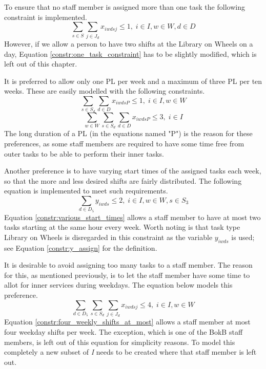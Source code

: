 To ensure that no staff member is assigned more than one task the following constraint is implemented.
\begin{equation} \label{constr:one_task_constraint}
\sum_{s\in S}\sum_{j\in J_d} x_{iwdsj} \leq 1, \;   i\in I, w \in W, d\in D
\end{equation}
However, if we allow a person to have two shifts at the Library on Wheels on a day, Equation \ref{constr:one_task_constraint} has to be slightly modified, which is left out of this chapter.

It is preferred to allow only one PL per week and a maximum of three PL per ten weeks. These are easily modelled with the following constraints.
\begin{equation} \label{constr:one_PL}
\sum_{s \in S_d}\sum_{d \in D} x_{iwdsP} \leq 1, \;   i\in I, w \in W
\end{equation}
\begin{equation} \label{constr:three_PL}
\sum_{w \in W}\sum_{s \in S_d}\sum_{d \in D} x_{iwdsP} \leq 3, \;   i\in I
\end{equation}
The long duration of a PL (in the equations named "P") is the reason for these preferences, as some staff members are required to have some time free from outer tasks to be able to perform their inner tasks.

Another preference is to have varying start times of the assigned tasks each week, so that the more and less desired shifts are fairly distributed. The following equation is implemented to meet such requirements.
\begin{equation} \label{constr:various_start_times}
\sum_{d \in D_5} y_{iwds} \leq 2, \;   i\in I, w \in W, s \in S_3
\end{equation}
Equation \ref{constr:various_start_times} allows a staff member to have at most two tasks starting at the same hour every week. Worth noting is that task type Library on Wheels is disregarded in this constraint as the variable $y_{iwds}$ is used; see Equation \ref{constr:y_assign} for the definition.

It is desirable to avoid assigning too many tasks to a staff member. The reason for this, as mentioned previously, is to let the staff member have some time to allot for inner services during weekdays. The equation below models this preference.
\begin{equation} \label{constr:four_weekly_shifts_at_most}
\sum_{d \in D_5}\sum_{s \in S_d}\sum_{j \in J_d} x_{iwdsj} \leq 4, \;   i\in I, w \in W
\end{equation}
Equation \ref{constr:four_weekly_shifts_at_most} allows a staff member at most four weekday shifts per week. The exception, which is one of the BokB staff members, is left out of this equation for simplicity reasons. To model this completely a new subset of \textit{I} needs to be created where that staff member is left out. 

